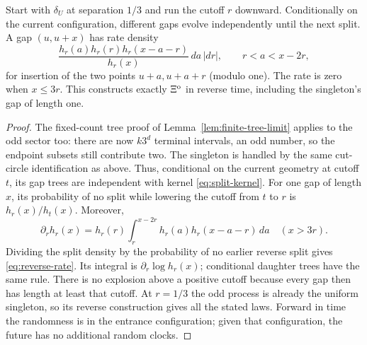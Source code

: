 \documentclass[11pt,letterpaper]{article}
\begin{document}
\begin{proposition}
\label{prop:reverse-process}
Start with $\delta_U$ at separation $1/3$ and run the cutoff $r$ downward.
Conditionally on the current configuration, different gaps evolve
independently until the next split. A gap $(u,u+x)$ has rate density
\begin{equation}\label{eq:reverse-rate}
 \frac{h_r(a)h_r(r)h_r(x-a-r)}{h_r(x)}\,da\,|dr|,
 \qquad r<a<x-2r,
\end{equation}
for insertion of the two points $u+a,u+a+r$ (modulo one).
The rate is zero when $x\le3r$. This constructs exactly
$\Xi^{\rm o}$ in reverse time, including the singleton's gap of length one.
\end{proposition}
\begin{proof}
The fixed-count tree proof of Lemma~\ref{lem:finite-tree-limit} applies
to the odd sector too: there are now $k3^d$ terminal intervals, an odd
number, so the endpoint subsets still contribute two. The singleton is
handled by the same cut-circle identification as above. Thus, conditional
on the current geometry at cutoff $t$, its gap trees are independent with
kernel \eqref{eq:split-kernel}.
For one gap of length $x$, its probability of no split while lowering
the cutoff from $t$ to $r$ is $h_r(x)/h_t(x)$. Moreover,
\[
 \partial_r h_r(x)=h_r(r)\int_r^{x-2r}
                         h_r(a)h_r(x-a-r)\,da\quad(x>3r).
\]
Dividing the split density by the probability of no earlier reverse
split gives \eqref{eq:reverse-rate}. Its integral is
$\partial_r\log h_r(x)$; conditional daughter trees have the same rule.
There is no explosion above a positive cutoff because every gap then
has length at least that cutoff. At $r=1/3$ the odd process is already
the uniform singleton, so its reverse construction gives all the stated
laws. Forward in time the randomness is in the entrance configuration;
given that configuration, the future has no additional random clocks.
\end{proof}
\end{document}
